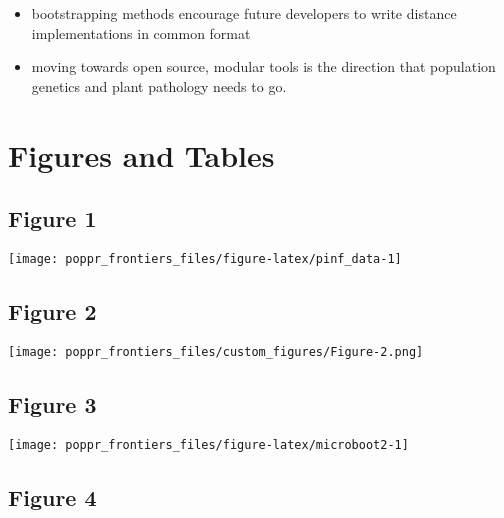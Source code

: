 \documentclass{frontiersSCNS} %
\newenvironment{CodeChunk}{}{}
\begin{document}
\begin{itemize}
\itemsep1pt\parskip0pt
\item
  bootstrapping methods encourage future developers to write distance
  implementations in common format
\item
  moving towards open source, modular tools is the direction that
  population genetics and plant pathology needs to go.
\end{itemize}

\section*{Figures and Tables}\label{figures-and-tables}

\subsection*{Figure 1}\label{figure-1}

\begin{CodeChunk}

\texttt{[image: poppr\_frontiers\_files/figure-latex/pinf\_data-1]} \end{CodeChunk}

\subsection*{Figure 2}\label{figure-2}

\texttt{[image: poppr\_frontiers\_files/custom\_figures/Figure-2.png]}

\subsection*{Figure 3}\label{figure-3}

\begin{CodeChunk}

\texttt{[image: poppr\_frontiers\_files/figure-latex/microboot2-1]} \end{CodeChunk}

\subsection*{Figure 4}\label{figure-4}
\end{document}
